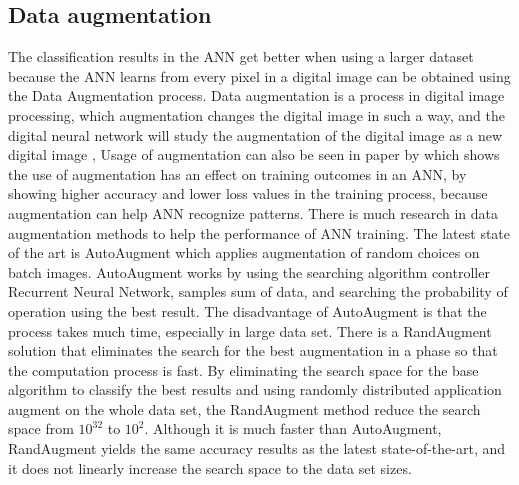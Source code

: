 \documentclass{article}
\begin{document}
\subsection{Data augmentation}
The classification results in the ANN get better when using a larger dataset \citep{shahinfar2020datasize} because the ANN learns from every pixel in a digital image can be obtained using the Data Augmentation process. Data augmentation is a process in digital image processing, which augmentation changes the digital image in such a way, and the digital neural network will study the augmentation of the digital image as a new digital image \citep{Wang2016},  Usage of augmentation can also be seen in paper by \cite{fadhil2020}  which shows the use of augmentation has an effect on training outcomes in an ANN, by showing higher accuracy and lower loss values in the training process, because augmentation can help ANN recognize patterns. There is much research in data augmentation methods to help the performance of ANN training. The latest state of the art is AutoAugment \citep{cubuk2018autoaugment} which applies augmentation of random choices on batch images. AutoAugment works by using the searching algorithm controller Recurrent Neural Network, samples sum of data, and searching the probability of operation using the best result. The disadvantage of AutoAugment is that the process takes much time, especially in large data set. There is a RandAugment \citep{cubuk2019randaugment} solution that eliminates the search for the best augmentation in a phase so that the computation process is fast. By eliminating the search space for the base algorithm to classify the best results and using randomly distributed application augment on the whole data set, the RandAugment method reduce the search space from $10^{32}$ to $10^2$. Although it is much faster than AutoAugment, RandAugment yields the same accuracy results as the latest state-of-the-art, and it does not linearly increase the search space to the data set sizes.

\end{document}

